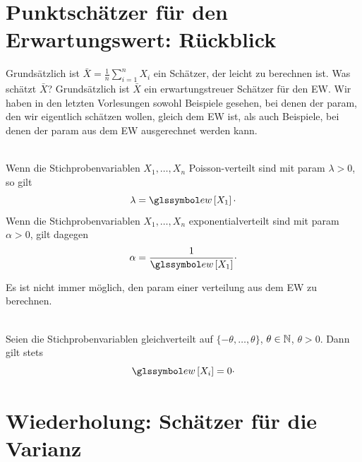

\section{Punktschätzer für den Erwartungswert: Rückblick}\label{sec:punktschaetzer-rueckblick-juli}

 Grundsätzlich ist $\bar X = \frac1n\sum_{i=1}^n X_i$ ein \gls{Schätzer}, der leicht zu berechnen ist.
Was schätzt $\bar X$? Grundsätzlich ist $\bar X$ ein erwartungstreuer \gls{Schätzer} für den EW.
Wir haben in den letzten Vorlesungen sowohl Beispiele gesehen, bei denen der \gls{param}, den wir eigentlich
schätzen wollen, gleich dem EW ist, als auch Beispiele, bei denen der \gls{param} aus dem EW ausgerechnet werden
kann.

\begin{bsp}
     \\
    Wenn die Stichprobenvariablen $X_1,\dots,X_n$ Poisson-verteilt sind mit \gls{param} $\lambda>0$, so gilt
    \[
        \lambda = \E{X_1} \cdot
    \]
    Wenn die Stichprobenvariablen $X_1,\dots,X_n$ exponentialverteilt sind mit \gls{param} $\alpha>0$, gilt dagegen
    \[
        \alpha = \frac{1}{\E{X_1}} \cdot
    \]
\end{bsp}

Es ist nicht immer möglich, den \gls{param} einer \gls{verteilung} aus dem EW zu berechnen.

\begin{bsp}
     \\
    Seien die Stichprobenvariablen gleichverteilt auf $\{-\theta,\dots,\theta\}$, $\theta\in\mathbb{N}$, $\theta>0$.
    Dann
    gilt stets
    \[
        \E{X_i} = 0 \cdot
    \]
\end{bsp}


\section{Wiederholung: Schätzer für die Varianz}\label{sec:varianzschaetzer-wiederholung}

